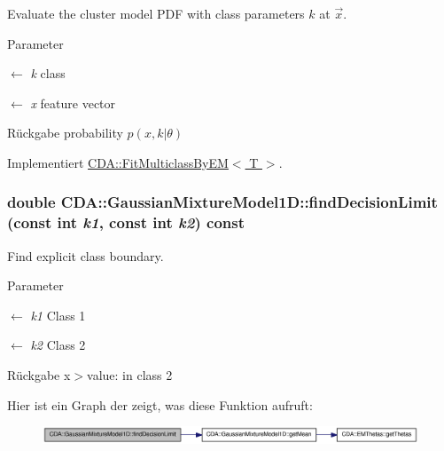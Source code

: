 Evaluate the cluster model PDF with class parameters $k$ at $\vec{x}$. 


\begin{DoxyParams}{Parameter}
\item[\mbox{$\leftarrow$} {\em k}]class \item[\mbox{$\leftarrow$} {\em x}]feature vector\end{DoxyParams}
\begin{DoxyReturn}{Rückgabe}
probability $p(x,k\vert\theta)$ 
\end{DoxyReturn}


Implementiert \hyperlink{classCDA_1_1FitMulticlassByEM_a5853c1889b12e567d2d9ab6c395dfe0d}{CDA::FitMulticlassByEM$<$ T $>$}.

\hypertarget{classCDA_1_1GaussianMixtureModel1D_af375c24f37a361437719bfe42b03fd4a}{
\subsubsection[{findDecisionLimit}]{\setlength{\rightskip}{0pt plus 5cm}double CDA::GaussianMixtureModel1D::findDecisionLimit (const int {\em k1}, \/  const int {\em k2}) const}}
\label{classCDA_1_1GaussianMixtureModel1D_af375c24f37a361437719bfe42b03fd4a}


Find explicit class boundary. 


\begin{DoxyParams}{Parameter}
\item[\mbox{$\leftarrow$} {\em k1}]Class 1 \item[\mbox{$\leftarrow$} {\em k2}]Class 2\end{DoxyParams}
\begin{DoxyReturn}{Rückgabe}
x$>$value: in class 2 
\end{DoxyReturn}


Hier ist ein Graph der zeigt, was diese Funktion aufruft:\nopagebreak
\begin{figure}[H]
\begin{center}
\leavevmode
\includegraphics[width=342pt]{classCDA_1_1GaussianMixtureModel1D_af375c24f37a361437719bfe42b03fd4a_cgraph}
\end{center}
\end{figure}


